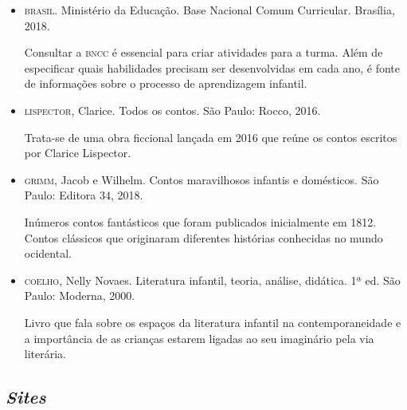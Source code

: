 \documentclass[11pt]{extarticle}
\begin{document}
\begin{itemize}
\item \textsc{brasil}. Ministério da Educação. Base Nacional Comum Curricular. Brasília, 2018.

Consultar a \textsc{bncc} é essencial para criar atividades para a turma. Além de especificar quais habilidades precisam ser desenvolvidas em cada ano, é fonte de informações sobre o processo de aprendizagem infantil. 

\item \textsc{lispector}, Clarice. Todos os contos. São Paulo: Rocco, 2016.

Trata-se de uma obra ficcional lançada em 2016 que reúne os contos escritos por Clarice Lispector. 
 
\item \textsc{grimm}, Jacob e Wilhelm. Contos maravilhosos infantis e domésticos. São Paulo: Editora 34, 2018.

Inúmeros contos fantásticos que foram publicados inicialmente em 1812. Contos clássicos que originaram diferentes histórias conhecidas no mundo ocidental.

\item \textsc{coelho}, Nelly Novaes. Literatura infantil, teoria, análise, didática. 1ª ed. São Paulo: Moderna, 2000.

Livro que fala sobre os espaços da literatura infantil na contemporaneidade e a importância de as crianças estarem ligadas ao seu imaginário pela via literária.

\end{itemize}

\subsection{\textit{Sites}}
\end{document}
